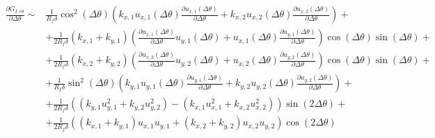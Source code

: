 \documentclass[a4paper]{jpconf}
\begin{document}
\begin{equation}
\begin{split}
\frac{\partial G_{I,r\theta}}{\partial\Delta\theta} \sim&\frac{1}{R_{f}\delta}\cos^{2}\left(\Delta\theta\right)\left( k_{x,1}u_{x,1}\left(\Delta\theta\right)\frac{\partial u_{x,1}\left(\Delta\theta\right)}{\partial\Delta\theta}+k_{x,2}u_{x,2}\left(\Delta\theta\right)\frac{\partial u_{x,2}\left(\Delta\theta\right)}{\partial\Delta\theta}\right)+\\
&+\frac{1}{2R_{f}\delta}\left(k_{x,1}+k_{y,1}\right)\left(\frac{\partial u_{x,1}\left(\Delta\theta\right)}{\partial\Delta\theta}u_{y,1}\left(\Delta\theta\right)+u_{x,1}\left(\Delta\theta\right)\frac{\partial u_{y,1}\left(\Delta\theta\right)}{\partial\Delta\theta}\right)\cos\left(\Delta\theta\right)\sin\left(\Delta\theta\right)+\\
&+\frac{1}{2R_{f}\delta}\left(k_{x,2}+k_{y,2}\right)\left(\frac{\partial u_{x,2}\left(\Delta\theta\right)}{\partial\Delta\theta}u_{y,2}\left(\Delta\theta\right)+u_{x,2}\left(\Delta\theta\right)\frac{\partial u_{y,2}\left(\Delta\theta\right)}{\partial\Delta\theta}\right)\cos\left(\Delta\theta\right)\sin\left(\Delta\theta\right)+\\
&+\frac{1}{R_{f}\delta}\sin^{2}\left(\Delta\theta\right)\left(k_{y,1}u_{y,1}\left(\Delta\theta\right)\frac{\partial u_{y,1}\left(\Delta\theta\right)}{\partial\Delta\theta}+k_{y,2}u_{y,2}\left(\Delta\theta\right)\frac{\partial u_{y,2}\left(\Delta\theta\right)}{\partial\Delta\theta}\right)+\\
&+\frac{1}{2R_{f}\delta}\left(\left(k_{y,1}u^{2}_{y,1}+k_{y,2}u^{2}_{y,2}\right)-\left(k_{x,1}u^{2}_{x,1}+k_{x,2}u^{2}_{x,2}\right)\right)\sin\left(2\Delta\theta\right)+\\
&+\frac{1}{2R_{f}\delta}\left(\left(k_{x,1}+k_{y,1}\right)u_{x,1}u_{y,1}+\left(k_{x,2}+k_{y,2}\right)u_{x,2}u_{y,2}\right)\cos\left(2\Delta\theta\right)\\
\end{split}
\end{equation}
\end{document}
